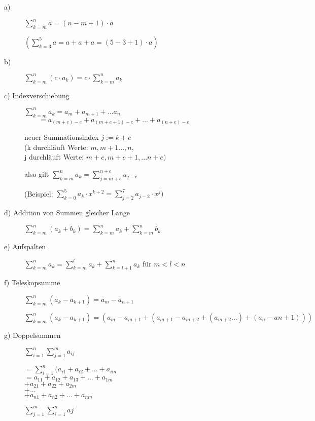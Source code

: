 \documentclass[a4paper, 12pt, twoside] {article}
\begin{document}
\begin{description}
	\item[a)] \hfill

	$\sum_{k=m}^{n} a = (n - m+ 1)  \cdot  a$

	$(\sum_{k=3}^{5} a = a + a + a = (5-3+1) \cdot a)$

	\item[b)] \hfill

	$\sum_{k=m}^{n} (c  \cdot  a_k) = c  \cdot  \sum_{k=m}^{n} a_k$

	\item[c) Indexverschiebung] \hfill

	$\sum_{k=m}^{n} a_k = a_m + a_{m+1} + ... a_n$ \\
	$\qquad = a_{(m + e) - e} + a_{(m+e+1)-e} + ... + a_{(n+e)-e}$

	neuer Summationsindex $j := k +e$ \\
	(k durchläuft Werte: $m, m+1 ..., n$, \\
	j durchläuft Werte: $m + e, m+e+1, ... n+e)$

	also gilt
	$\sum_{k=m}^{n} a_k = \sum_{j = m+e}^{n+e} a_{j-e}$

	(Beispiel:
	$\sum_{k=0}^{5} a_k  \cdot  x^{k+2} = \sum_{j = 2}^{7} a_{j-2}  \cdot  x^j)$

	\item[d) Addition von Summen gleicher Länge] \hfill

	$\sum_{k=m}^{n} (a_k + b_k) = \sum_{k=m}^{n} a_k + \sum_{k=m}^{n} b_k$

	\item[e) Aufspalten] \hfill

	$\sum_{k=m}^{n} a_k = \sum_{k=m}^{l} a_k + \sum_{k=l+1}^{n} a_k$ für  $m < l < n$

	\item[f) Teleskopsumme] \hfill

	$\sum_{k=m}^{n} (a_k - a_{k+1}) = a_m - a_{n+1}$

	$\sum_{k=m}^{n} (a_k - a_{k+1}) = (a_m - a_{m+1} + (a_{m+1} - a_{m+2} + (a_{m+2} ... ) + (a_n - a{n+1})))$ %

	\item[g) Doppelsummen] \hfill

	$\sum_{i=1}^{n} \sum_{j=1}^{m} a_{ij}$

	$= \sum_{i=1}^{n} (a_{i1} + a_{i2} + ... + a_{im}$ \\
	$= a_{11} + a_{12} + a_{13} + ... + a_{1m}$ \\
	$+ a_{21} + a_{22} + a_{2m}$ \\
	$+ ...$ \\
	$+ a_{n1} + a_{n2} + ... + a_{nm}$

	$\sum_{j=1}^{m} \sum_{i=1}^{n} aj$

\end{description}
\end{document}
